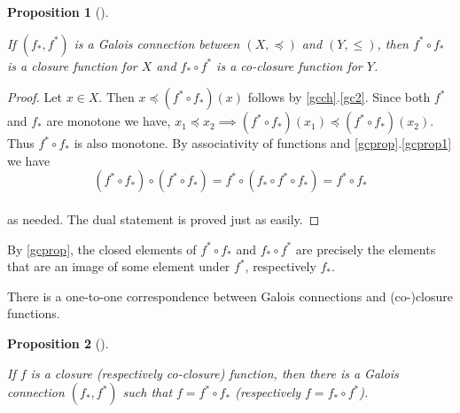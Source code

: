 \documentclass[
  twoside,
  12pt,
  letterpaper,
  fleqn]{article}
\theoremstyle{plain}
\newtheorem{proposition}{Proposition}[section]
\theoremstyle{definition}
\theoremstyle{definition}
\theoremstyle{remark}
\begin{document}
\begin{proposition}[]\protect\hypertarget{prp-galois-connection-closure-function}{}\label{prp-galois-connection-closure-function}

If \((f_*, f^*)\) is a Galois connection between \((X,\preceq)\) and
\((Y,\leqslant)\), then \(f^*\circ f_*\) is a closure function for \(X\)
and \(f_*\circ f^*\) is a co-closure function for \(Y\).

\end{proposition}

\begin{proof}

Let \(x\in X\). Then \(x\preceq (f^*\circ f_*)(x)\) follows by
\eqref{gcch}.\eqref{gc2}. Since both \(f^*\) and \(f_*\) are monotone we
have,
\(x_1\preceq x_2 \implies (f^*\circ f_*)(x_1)\preceq (f^*\circ f_*)(x_2)\).
Thus \(f^*\circ f_*\) is also monotone. By associativity of functions
and \eqref{gcprop}.\eqref{gcprop1} we have \[
(f^*\circ f_*)\circ (f^*\circ f_*)=f^*\circ (f_*\circ f^*\circ f_*)=f^*\circ f_*
\]\\
as needed. The dual statement is proved just as easily.

\end{proof}

By \eqref{gcprop}, the closed elements of \(f^*\circ f_*\) and
\(f_*\circ f^*\) are precisely the elements that are an image of some
element under \(f^*\), respectively \(f_*\).

There is a one-to-one correspondence between Galois connections and
(co-)closure functions.

\begin{proposition}[]\protect\hypertarget{prp-closure-galois-connection}{}\label{prp-closure-galois-connection}

If \(f\) is a closure (respectively co-closure) function, then there is
a Galois connection \((f_*,f^*)\) such that \(f=f^*\circ f_*\)
(respectively \(f=f_*\circ f^*\)).

\end{proposition}
\end{document}
